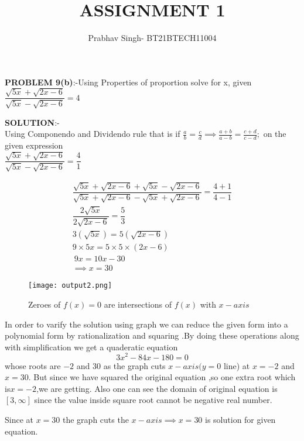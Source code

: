 \documentclass[journal,12pt,twocolumn]{IEEEtran}
\begin{document}
	\vspace{3cm}
	\title{ASSIGNMENT 1}
	\author{Prabhav Singh- BT21BTECH11004}
	
	\maketitle
	\textbf{PROBLEM 9(b)}:-Using Properties of proportion solve for x, given\\
	
	
	\hspace*{2cm}$ 	\dfrac{\sqrt{5x}+\sqrt{2x-6}}{\sqrt{5x}-\sqrt{2x-6}} =4 $
	
	
	\medskip
	
	
	\textbf{SOLUTION}:-\\
	Using Componendo and Dividendo rule that is if $  \frac{a}{b} =\frac{c}{d} \implies \frac{a+b}{a-b} =\frac{c+d}{c-d}; $ on the given expression\\
	
	 $	\dfrac{\sqrt{5x}+\sqrt{2x-6}}{\sqrt{5x}-\sqrt{2x-6}} =\dfrac{4}{1} $
	
	\begin{align}
		\dfrac{\sqrt{5x}+\sqrt{2x-6}+\sqrt{5x}-\sqrt{2x-6}}{\sqrt{5x}+\sqrt{2x-6}-\sqrt{5x}+\sqrt{2x-6}} =\dfrac{4+1}{4-1} \\ 
		\dfrac{2\sqrt{5x}}{2\sqrt{2x-6}} =\dfrac{5}{3} \\
		3(\sqrt{5x})=5(\sqrt{2x-6}) \\
		9\times5x=5\times5\times(2x-6) \\
		\ 9x=10x-30 \\
		\implies \boxed{ x=30} 
	\end{align}
	
	\medskip
	
		\begin{figure}[h]
		\centering
		\texttt{[image: output2.png]}
		\caption{Zeroes of $ f(x) = 0 $ are intersections of $ f(x) $ with $x-axis $}
		\label{Fig1}
	\end{figure}

	In order to varify the solution using graph we can reduce the given form into a polynomial form by rationalization and squaring .By doing these operations along with simplification we get a quaderatic equation 
	\begin{equation}
		3x^{2}-84x-180=0
	\end{equation}
whose roots are $ -2 $ and $ 30 $ as the graph cuts $  x- axis(y=0  $ line) at $  x= -2 $ and $ x=30 $. But since we have squared the original equation ,so one extra root which is$  x= -2  $,we are getting. Also one can see the domain of original equation is$  [3,\infty] $ since the value inside square root cannot be negative real number. 


	Since at $ x=30 $ the graph cuts the $ x-axis \implies x=30 $ is solution for given equation.
\end{document}
